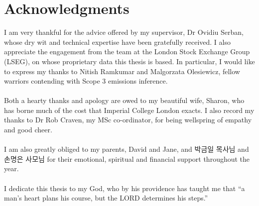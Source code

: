 \documentclass[12pt,twoside]{report}
\begin{document}
\begin{abstract}
\textbf{Results: }Scope 3 emissions are best estimated by: using emission intensities (that is, emissions divided by revenue); a core set of features; and (where sufficient data exists) by focusing solely on material disclosures. Each of these choices significantly improves predictive performance compared to the alternatives. In contrast to these unambiguous choices, no single model architecture clearly outperforms the others for all target variables, with machine learning models offering performance which is comparable to simpler models. Nevertheless, by filtering the data using material disclosures, my best Scope 3 model achieves superior predictive accuracy over the best model for Scopes 1 and 2. Furthermore, with respect to predictive accuracy, these results represent a substantial improvement over previous machine learning attempts to estimate Scope 3 emissions. 
\\\\
\textbf{Conclusion: }Overall, my findings suggest that improving Scope 3 emission estimates depends primarily on addressing limitations in data coverage and quality rather than refining model architecture. While enhancing data inputs leads to significant gains in predictive accuracy, the comparable performance of machine learning models to simpler models indicates that the core challenge in Scope 3 modelling is not complex interactions or non-linear relationships, which machine learning is typically suited to address. This highlights the need for improved data practices over more advanced modeling techniques when tackling Scope 3 estimation.   

  
\end{abstract}

\clearpage
\section*{Acknowledgments}
I am very thankful for the advice offered by my supervisor, Dr Ovidiu Serban, whose dry wit and technical expertise have been gratefully received. I also appreciate the engagement from the team at the London Stock Exchange Group (LSEG), on whose proprietary data this thesis is based. In particular, I would like to express my thanks to Nitish Ramkumar and Malgorzata Olesiewicz, fellow warriors contending with Scope 3 emissions inference. 
\\\\
Both a hearty thanks and apology are owed to my beautiful wife, Sharon, who has borne much of the cost that Imperial College London exacts. I also record my thanks to Dr Rob Craven, my MSc co-ordinator, for being wellspring of empathy and good cheer. 
\\\\
I am also greatly obliged to my parents, David and Jane, and 박금일 목사님 and 손명은 사모님 for their emotional, spiritual and financial support throughout the year. 
\\\\
I dedicate this thesis to my God, who by his providence has taught me that ``a man’s heart plans his course, but the LORD determines his steps.''
\end{document}
